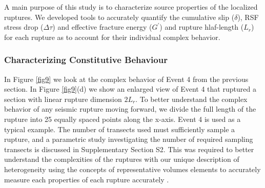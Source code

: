 \documentclass[final,3p, 11pt,authoryear]{elsarticle}
\begin{document}
A main purpose of this study is to characterize source properties of the localized ruptures. We developed tools to accurately quantify the cumulative slip ($\delta$), RSF stress drop ($\Delta \tau$) and effective fracture energy ($G^{'}$) and rupture hlaf-length ($L_{r}$) for each rupture as to account for their individual complex behavior.

\subsubsection{Characterizing Constitutive Behaviour}
\label{Constitutive}

In Figure \ref{fig9} we look at the complex behavior of Event 4 from the previous section.  In Figure \ref{fig9}(d) we show an enlarged view of Event 4 that ruptured a section with linear rupture dimension $2L_{r}$.  To better understand the complex behavior of any seismic rupture moving forward, we divide the full length of the rupture into 25 equally spaced points along the x-axis.  Event 4 is used as a typical example. The number of transects used must sufficiently sample a rupture, and a parametric study investigating the number of required sampling transects is discussed in Supplementary Section S2. This was required to better understand the complexities of the ruptures with our unique description of heterogeneity using the concepts of representative volumes elements to accurately measure each properties of each rupture accurately \citep{Hill1963}.   
\end{document}
